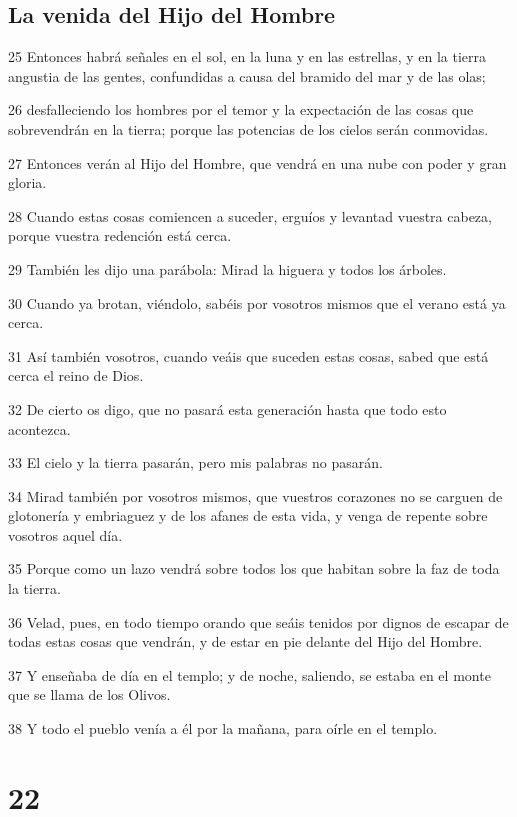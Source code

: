 \section*{La venida del Hijo del Hombre}

\par 25 Entonces habrá señales en el sol, en la luna y en las estrellas, y en la tierra angustia de las gentes, confundidas a causa del bramido del mar y de las olas;
\par 26 desfalleciendo los hombres por el temor y la expectación de las cosas que sobrevendrán en la tierra; porque las potencias de los cielos serán conmovidas.
\par 27 Entonces verán al Hijo del Hombre, que vendrá en una nube con poder y gran gloria.
\par 28 Cuando estas cosas comiencen a suceder, erguíos y levantad vuestra cabeza, porque vuestra redención está cerca.
\par 29 También les dijo una parábola: Mirad la higuera y todos los árboles.
\par 30 Cuando ya brotan, viéndolo, sabéis por vosotros mismos que el verano está ya cerca.
\par 31 Así también vosotros, cuando veáis que suceden estas cosas, sabed que está cerca el reino de Dios.
\par 32 De cierto os digo, que no pasará esta generación hasta que todo esto acontezca.
\par 33 El cielo y la tierra pasarán, pero mis palabras no pasarán.
\par 34 Mirad también por vosotros mismos, que vuestros corazones no se carguen de glotonería y embriaguez y de los afanes de esta vida, y venga de repente sobre vosotros aquel día.
\par 35 Porque como un lazo vendrá sobre todos los que habitan sobre la faz de toda la tierra.
\par 36 Velad, pues, en todo tiempo orando que seáis tenidos por dignos de escapar de todas estas cosas que vendrán, y de estar en pie delante del Hijo del Hombre.
\par 37 Y enseñaba de día en el templo; y de noche, saliendo, se estaba en el monte que se llama de los Olivos.
\par 38 Y todo el pueblo venía a él por la mañana, para oírle en el templo.

\chapter{22}

